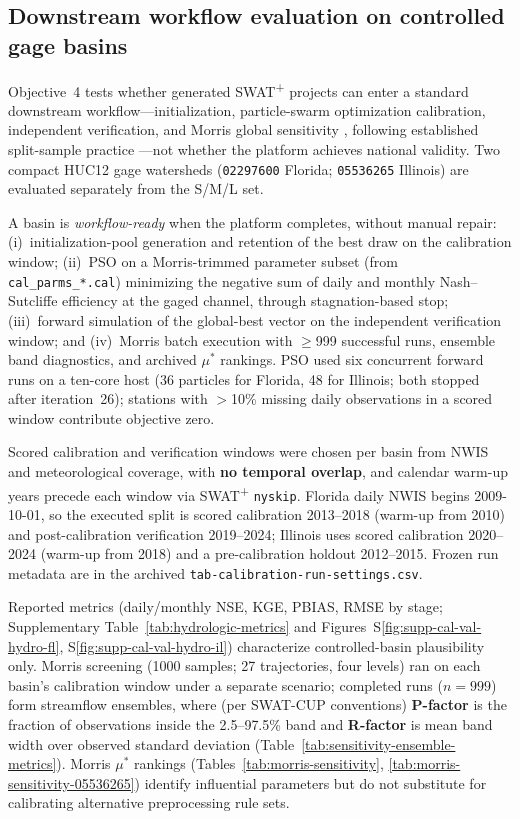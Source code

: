 \subsection{Downstream workflow evaluation on controlled gage basins}
\label{sec:methods-calibration}

Objective~4 tests whether generated SWAT\textsuperscript{+} projects can enter a standard downstream workflow---initialization, particle-swarm optimization \citep[PSO;][]{KennedyEberhart1995PSO} calibration, independent verification, and Morris global sensitivity \citep{Morris1991FactorialSampling, Campolongo2007ScreeningDesign}, following established split-sample practice \citep{Arnold2012SWATCalibration}---not whether the platform achieves national validity. Two compact HUC12 gage watersheds (\texttt{02297600} Florida; \texttt{05536265} Illinois) are evaluated separately from the S/M/L set.

A basin is \emph{workflow-ready} when the platform completes, without manual repair: (i)~initialization-pool generation and retention of the best draw on the calibration window; (ii)~PSO on a Morris-trimmed parameter subset (from \texttt{cal\_parms\_*.cal}) minimizing the negative sum of daily and monthly Nash--Sutcliffe efficiency \citep[NSE;][]{Moriasi2007ModelEval} at the gaged channel, through stagnation-based stop; (iii)~forward simulation of the global-best vector on the independent verification window; and (iv)~Morris batch execution with $\geq$999 successful runs, ensemble band diagnostics, and archived $\mu^*$ rankings. PSO used six concurrent forward runs on a ten-core host (36 particles for Florida, 48 for Illinois; both stopped after iteration~26); stations with $>$10\% missing daily observations in a scored window contribute objective zero.

Scored calibration and verification windows were chosen per basin from NWIS and meteorological coverage, with \textbf{no temporal overlap}, and calendar warm-up years precede each window via SWAT\textsuperscript{+} \texttt{nyskip}. Florida daily NWIS begins 2009-10-01, so the executed split is scored calibration 2013--2018 (warm-up from 2010) and post-calibration verification 2019--2024; Illinois uses scored calibration 2020--2024 (warm-up from 2018) and a pre-calibration holdout 2012--2015. Frozen run metadata are in the archived \texttt{tab-calibration-run-settings.csv}.

Reported metrics (daily/monthly NSE, KGE, PBIAS, RMSE by stage; Supplementary Table~\ref{tab:hydrologic-metrics} and Figures~S\ref{fig:supp-cal-val-hydro-fl}, S\ref{fig:supp-cal-val-hydro-il}) characterize controlled-basin plausibility only. Morris screening (1000 samples; 27 trajectories, four levels) ran on each basin's calibration window under a separate scenario; completed runs ($n=999$) form streamflow ensembles, where (per SWAT-CUP conventions) \textbf{P-factor} is the fraction of observations inside the 2.5--97.5\% band and \textbf{R-factor} is mean band width over observed standard deviation (Table~\ref{tab:sensitivity-ensemble-metrics}). Morris $\mu^*$ rankings (Tables~\ref{tab:morris-sensitivity}, \ref{tab:morris-sensitivity-05536265}) identify influential parameters but do not substitute for calibrating alternative preprocessing rule sets.
